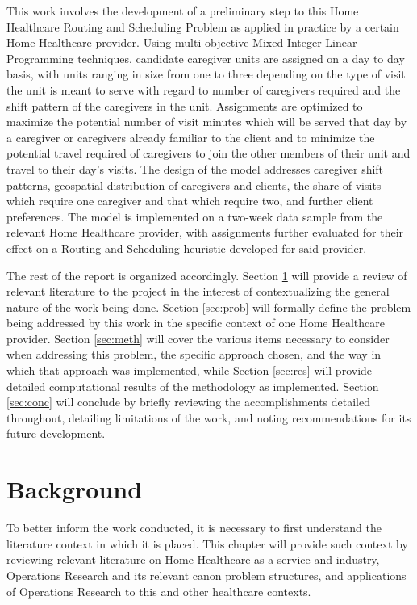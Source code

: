 \documentclass[11pt,twoside]{article}
\numberwithin{Theorem}{section}
\numberwithin{Definition}{section}
\numberwithin{Lemma}{section}
\numberwithin{Algorithm}{section}
\numberwithin{equation}{section}
\begin{document}
This work involves the development of a preliminary step to this Home Healthcare Routing and Scheduling Problem as applied in practice by a certain Home Healthcare provider. Using multi-objective Mixed-Integer Linear Programming techniques, candidate caregiver units are assigned on a day to day basis, with units ranging in size from one to three depending on the type of visit the unit is meant to serve with regard to number of caregivers required and the shift pattern of the caregivers in the unit. Assignments are optimized to maximize the potential number of visit minutes which will be served that day by a caregiver or caregivers already familiar to the client and to minimize the potential travel required of caregivers to join the other members of their unit and travel to their day's visits. The design of the model addresses caregiver shift patterns, geospatial distribution of caregivers and clients, the share of visits which require one caregiver and that which require two, and further client preferences. The model is implemented on a two-week data sample from the relevant Home Healthcare provider, with assignments further evaluated for their effect on a Routing and Scheduling heuristic developed for said provider.

The rest of the report is organized accordingly. Section \ref{sec:background} will provide a review of relevant literature to the project in the interest of contextualizing the general nature of the work being done. Section \ref{sec:prob} will formally define the problem being addressed by this work in the specific context of one Home Healthcare provider. Section \ref{sec:meth} will cover the various items necessary to consider when addressing this problem, the specific approach chosen, and the way in which that approach was implemented, while Section \ref{sec:res} will provide detailed computational results of the methodology as implemented. Section \ref{sec:conc} will conclude by briefly reviewing the accomplishments detailed throughout, detailing limitations of the work, and noting recommendations for its future development.
\clearpage

\section{Background}
\label{sec:background}
To better inform the work conducted, it is necessary to first understand the literature context in which it is placed. This chapter will provide such context by reviewing relevant literature on Home Healthcare as a service and industry, Operations Research and its relevant canon problem structures, and applications of Operations Research to this and other healthcare contexts. 
\end{document}
